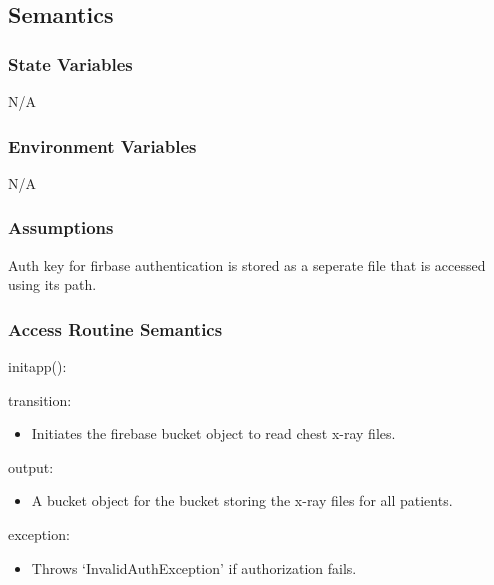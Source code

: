 \documentclass[12pt, titlepage]{article}
\begin{document}
\subsection{Semantics}

\subsubsection{State Variables}
N/A

\subsubsection{Environment Variables}
N/A

\subsubsection{Assumptions}
Auth key for firbase authentication is stored as a seperate file that is accessed using its path.

\subsubsection{Access Routine Semantics}

\noindent initapp():
\begin{itemize}
  \begin{item}
    transition:
    \begin{itemize}
      \item Initiates the firebase bucket object to read chest x-ray files.
    \end{itemize}
  \end{item}
  \begin{item}
    output:
    \begin{itemize}
      \item A bucket object for the bucket storing the x-ray files for all patients.
    \end{itemize}
  \end{item}
  \begin{item}
    exception:
    \begin{itemize}
      \item Throws `InvalidAuthException' if authorization fails.
    \end{itemize}
  \end{item}
\end{itemize}
\end{document}
